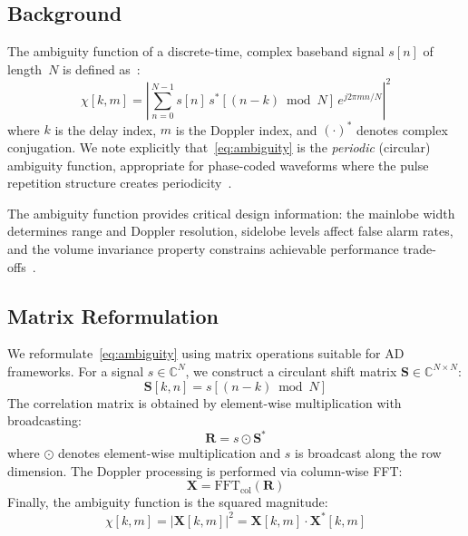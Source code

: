 \documentclass[journal]{IEEEtran}
\begin{document}
\subsection{Background}

The ambiguity function of a discrete-time, complex baseband signal $s[n]$ of length~$N$ is defined as~\cite{levanon2004radar}:
\begin{equation}
\chi[k, m] = \left| \sum_{n=0}^{N-1} s[n] \, s^*[(n-k) \bmod N] \, e^{j2\pi mn/N} \right|^2
\label{eq:ambiguity}
\end{equation}
where $k$ is the delay index, $m$ is the Doppler index, and $(\cdot)^*$ denotes complex conjugation.
We note explicitly that~\eqref{eq:ambiguity} is the \emph{periodic} (circular) ambiguity function, appropriate for phase-coded waveforms where the pulse repetition structure creates periodicity~\cite{levanon2004radar}.

The ambiguity function provides critical design information: the mainlobe width determines range and Doppler resolution, sidelobe levels affect false alarm rates, and the volume invariance property constrains achievable performance trade-offs~\cite{woodward1953probability}.

\subsection{Matrix Reformulation}

We reformulate~\eqref{eq:ambiguity} using matrix operations suitable for AD frameworks.
For a signal $s \in \mathbb{C}^N$, we construct a circulant shift matrix $\mathbf{S} \in \mathbb{C}^{N \times N}$:
\begin{equation}
\mathbf{S}[k, n] = s[(n - k) \bmod N]
\label{eq:shift}
\end{equation}
The correlation matrix is obtained by element-wise multiplication with broadcasting:
\begin{equation}
\mathbf{R} = s \odot \mathbf{S}^*
\label{eq:correlation}
\end{equation}
where $\odot$ denotes element-wise multiplication and $s$ is broadcast along the row dimension.
The Doppler processing is performed via column-wise FFT:
\begin{equation}
\mathbf{X} = \text{FFT}_{\text{col}}(\mathbf{R})
\label{eq:fft}
\end{equation}
Finally, the ambiguity function is the squared magnitude:
\begin{equation}
\chi[k, m] = |\mathbf{X}[k, m]|^2 = \mathbf{X}[k, m] \cdot \mathbf{X}^*[k, m]
\label{eq:magnitude}
\end{equation}
\end{document}
